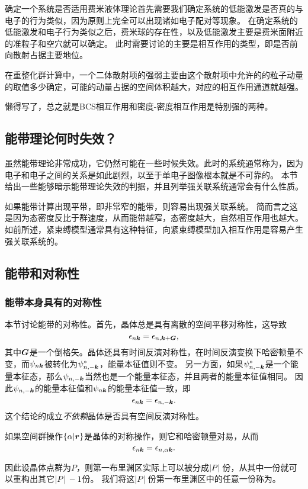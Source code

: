 确定一个系统是否适用费米液体理论首先需要我们确定系统的低能激发是否真的与电子的行为类似，因为原则上完全可以出现诸如电子配对等现象。
在确定系统的低能激发和电子行为类似之后，费米球的存在性，以及低能激发主要是费米面附近的准粒子和空穴就可以确定。
此时需要讨论的主要是相互作用的类型，即是否前向散射占据主要地位。

在重整化群计算中，一个二体散射项的强弱主要由这个散射项中允许的的粒子动量的取值多少确定，可能的动量占据的空间体积越大，对应的相互作用通道就越强。

懒得写了，总之就是BCS相互作用和密度-密度相互作用是特别强的两种。


\subsection{能带理论何时失效？}

虽然能带理论非常成功，它仍然可能在一些时候失效。此时的系统通常称为，因为电子和电子之间的关系是如此剧烈，以至于单电子图像根本就是不可靠的。
本节给出一些能够暗示能带理论失效的判据，并且列举强关联系统通常会有什么性质。

如果能带计算出现平带，即非常窄的能带，则容易出现强关联系统。
简而言之这是因为态密度反比于群速度，从而能带越窄，态密度越大，自然相互作用也越大。
如前所述，紧束缚模型通常具有这种特征，向紧束缚模型加入相互作用是容易产生强关联系统的。

\subsection{能带和对称性}

\subsubsection{能带本身具有的对称性}

本节讨论能带的对称性。首先，晶体总是具有离散的空间平移对称性，这导致
\begin{equation}
    \epsilon_{n \vb*{k}} = \epsilon_{n, \vb*{k} + \vb*{G}},
\end{equation}
其中$\vb*{G}$是一个倒格矢。晶体还具有时间反演对称性，在时间反演变换下哈密顿量不变，而$\psi_{n \vb*{k}}$被转化为$\psi^*_{n, -\vb*{k}}$，能量本征值则不变。
另一方面，如果$\psi^*_{n, -\vb*{k}}$是一个能量本征态，那么$\psi_{n, -\vb*{k}}$当然也是一个能量本征态，并且两者的能量本征值相同。
因此$\psi_{n, -\vb*{k}}$的能量本征值和$\psi_{n \vb*{k}}$的能量本征值一致，即
\begin{equation}
    \epsilon_{n \vb*{k}} = \epsilon_{n, -\vb*{k}}.
\end{equation}
这个结论的成立\emph{不依赖}晶体是否具有空间反演对称性。

如果空间群操作$\{ \alpha | \vb*{r} \}$是晶体的对称操作，则它和哈密顿量对易，从而
\begin{equation}
    \epsilon_{n \vb*{k}} = \epsilon_{n, \alpha \vb*{k}}.
\end{equation}

因此设晶体点群为$P$，则第一布里渊区实际上可以被分成$\abs*{P}$份，从其中一份就可以重构出其它$\abs*{P} - 1$份。
我们将这$\abs*{P}$份第一布里渊区中的任意一份称为。
